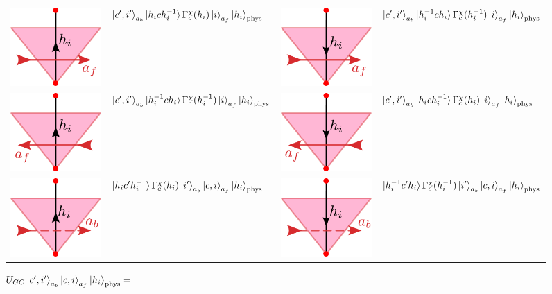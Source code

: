 \documentclass[two column]{article}
\begin{document}
\begin{figure}
\begin{tabular}{llll}
\end{tabular}\vspace{10pt}

\caption*{$U_{GC}\ket{c', i'}_{a_b} \ket{c, i}_{a_f}\ket{h_i}_{\text{phys}} = $}
\vspace{10pt}
	\begin{tabular}{llll}
 \includegraphics[width=0.12\linewidth]{Figures/IIRgf.pdf} &   $\ket{c', i'}_{a_b}\ket{h_i c h_i^{-1}} \Gamma^{\chi}_c(h_i)\ket{i}_{a_f}\ket{h_i}_{\text{phys}}$ &  \includegraphics[width=0.12\linewidth]{Figures/IIRif.pdf}           &       $\ket{c', i'}_{a_b}\ket{h_i^{-1} c h_i} \Gamma^{\chi}_c(h_i^{-1})\ket{i}_{a_f}\ket{h_i}_{\text{phys}}$                  \\ 
\includegraphics[width=0.12\linewidth]{Figures/IILif.pdf} &   $\ket{c', i'}_{a_b}\ket{h_i^{-1} c h_i} \Gamma^{\chi}_c(h_i^{-1})\ket{i}_{a_f}\ket{h_i}_{\text{phys}}$ &  \includegraphics[width=0.12\linewidth]{Figures/IILgf.pdf}           &       $\ket{c', i'}_{a_b}\ket{h_i c h_i^{-1}} \Gamma^{\chi}_c(h_i)\ket{i}_{a_f}\ket{h_i}_{\text{phys}}$                  \\  
 \includegraphics[width=0.12\linewidth]{Figures/IIRgb.pdf} &   $\ket{h_ic'h_i^{-1}}\Gamma_c^{\chi}(h_i)\ket{i'}_{a_b}\ket{c, i}_{a_f}\ket{h_i}_{\text{phys}}$  &  \includegraphics[width=0.12\linewidth]{Figures/IIRib.pdf}           &       $\ket{h_i^{-1}c'h_i}\Gamma_c^{\chi}(h_i^{-1})\ket{i'}_{a_b}\ket{c, i}_{a_f}\ket{h_i}_{\text{phys}}$                  \\ 

\end{tabular}
\end{figure}
\end{document}
